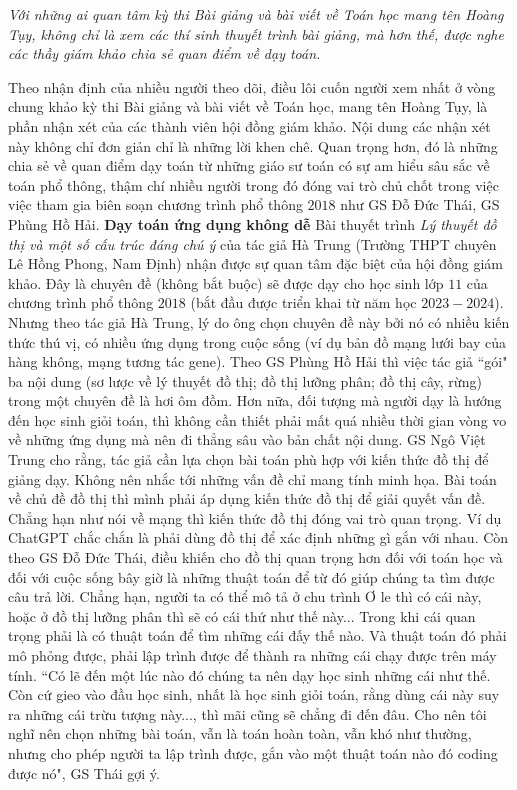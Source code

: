 \textit{Với những ai quan tâm kỳ thi Bài giảng và bài viết về Toán học mang tên Hoàng Tụy, không chỉ là xem các thí sinh thuyết trình bài giảng, mà hơn thế, được nghe các thầy giám khảo chia sẻ quan điểm về dạy toán.}

\begin{multicols}{2}
	Theo nhận định của nhiều người theo dõi, điều lôi cuốn người xem nhất ở vòng chung khảo kỳ thi Bài giảng và bài viết về Toán học, mang tên Hoàng Tụy, là phần nhận xét của các thành viên hội đồng giám khảo. Nội dung các nhận xét này không chỉ đơn giản chỉ là những lời khen chê. Quan trọng hơn, đó là những chia sẻ về quan điểm dạy toán từ những giáo sư toán có sự am hiểu sâu sắc về toán phổ thông, thậm chí nhiều người trong đó đóng vai trò chủ chốt trong việc việc tham gia biên soạn chương trình phổ thông $2018$ như GS Đỗ Đức Thái, GS Phùng Hồ Hải. 
	\vskip 0.1cm
	\textbf{\color{diendantoanhoc}Dạy toán ứng dụng không dễ}
	\vskip 0.1cm
	Bài thuyết trình \textit{Lý thuyết đồ thị và một số cấu trúc đáng chú ý} của tác giả Hà Trung (Trường THPT chuyên Lê Hồng Phong, Nam Định) nhận được sự quan tâm đặc biệt của hội đồng giám khảo. Đây là chuyên đề (không bắt buộc) sẽ được dạy cho học sinh lớp $11$ của chương trình phổ thông $2018$ (bắt đầu được triển khai từ năm học $2023-2024$). Nhưng theo tác giả Hà Trung, lý do ông chọn chuyên đề này bởi nó có nhiều kiến thức thú vị, có nhiều ứng dụng trong cuộc sống (ví dụ bản đồ mạng lưới bay của hàng không, mạng tương tác gene). 
	\vskip 0.1cm
	Theo GS Phùng Hồ Hải thì việc tác giả ``gói" ba nội dung (sơ lược về lý thuyết đồ thị; đồ thị lưỡng phân; đồ thị cây, rừng) trong một chuyên đề là hơi ôm đồm. Hơn nữa, đối tượng mà người dạy là hướng đến học sinh giỏi toán, thì không cần thiết phải mất quá nhiều thời gian vòng vo về những ứng dụng mà nên đi thẳng sâu vào bản chất nội dung. 
	\vskip 0.1cm
	GS Ngô Việt Trung cho rằng, tác giả cần lựa chọn bài toán phù hợp với kiến thức đồ thị để giảng dạy. Không nên nhắc tới những vấn đề chỉ mang tính minh họa. Bài toán về chủ đề đồ thị thì mình phải áp dụng kiến thức đồ thị để giải quyết vấn đề. Chẳng hạn như nói về mạng thì kiến thức đồ thị đóng vai trò quan trọng. Ví dụ ChatGPT chắc chắn là phải dùng đồ thị để xác định những gì gắn với nhau. 
	\vskip 0.1cm
	Còn theo GS Đỗ Đức Thái, điều khiến cho đồ thị quan trọng hơn đối với toán học và đối với cuộc sống bây giờ là những thuật toán để từ đó giúp chúng ta tìm được câu trả lời. Chẳng hạn, người ta có thể mô tả  ở chu trình Ơ le thì có cái này, hoặc ở đồ thị lưỡng phân thì sẽ có cái thứ như thế này... Trong khi cái quan trọng phải là có thuật toán để tìm những cái đấy thế nào. Và thuật toán đó phải mô phỏng được, phải lập trình được để thành ra những cái chạy được trên máy tính. ``Có lẽ đến một lúc nào đó chúng ta nên dạy học sinh những cái như thế. Còn cứ gieo vào đầu học sinh, nhất là học sinh giỏi toán, rằng dùng cái này suy ra những cái trừu tượng này..., thì mãi cũng sẽ chẳng đi đến đâu. Cho nên tôi nghĩ nên chọn những bài toán, vẫn là toán hoàn toàn, vẫn khó như thường, nhưng cho phép người ta lập trình được, gắn vào một thuật toán nào đó coding được nó", GS Thái gợi ý. 

\end{multicols}
